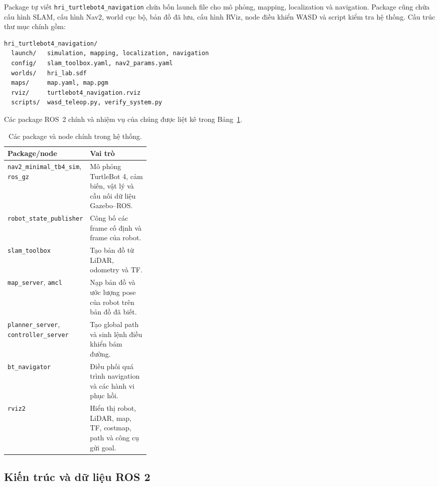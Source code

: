 \documentclass[12pt,a4paper]{article}
\begin{document}
Package tự viết \texttt{hri\_turtlebot4\_navigation} chứa bốn launch file cho
mô phỏng, mapping, localization và navigation. Package cũng chứa cấu hình SLAM,
cấu hình Nav2, world cục bộ, bản đồ đã lưu, cấu hình RViz, node điều khiển WASD và script kiểm tra hệ
thống. Cấu trúc thư mục chính gồm:

\begin{verbatim}
hri_turtlebot4_navigation/
  launch/   simulation, mapping, localization, navigation
  config/   slam_toolbox.yaml, nav2_params.yaml
  worlds/   hri_lab.sdf
  maps/     map.yaml, map.pgm
  rviz/     turtlebot4_navigation.rviz
  scripts/  wasd_teleop.py, verify_system.py
\end{verbatim}

Các package ROS~2 chính và nhiệm vụ của chúng được liệt kê trong
Bảng~\ref{tab:packages}.

\begin{table}[htbp]
  \centering
  \caption{Các package và node chính trong hệ thống.}
  \label{tab:packages}
  \small
  \renewcommand{\arraystretch}{1.15}
  \begin{tabularx}{\linewidth}{@{}p{0.33\linewidth}X@{}}
    \toprule
    \textbf{Package/node} & \textbf{Vai trò} \\
    \midrule
    \texttt{nav2\_minimal\_tb4\_sim}, \texttt{ros\_gz} & Mô phỏng TurtleBot 4, cảm biến, vật lý và cầu nối dữ liệu Gazebo--ROS. \\
    \texttt{robot\_state\_publisher} & Công bố các frame cố định và frame của robot. \\
    \texttt{slam\_toolbox} & Tạo bản đồ từ LiDAR, odometry và TF. \\
    \texttt{map\_server}, \texttt{amcl} & Nạp bản đồ và ước lượng pose của robot trên bản đồ đã biết. \\
    \texttt{planner\_server}, \texttt{controller\_server} & Tạo global path và sinh lệnh điều khiển bám đường. \\
    \texttt{bt\_navigator} & Điều phối quá trình navigation và các hành vi phục hồi. \\
    \texttt{rviz2} & Hiển thị robot, LiDAR, map, TF, costmap, path và công cụ gửi goal. \\
    \bottomrule
  \end{tabularx}
\end{table}

\subsection{Kiến trúc và dữ liệu ROS 2}
\end{document}
